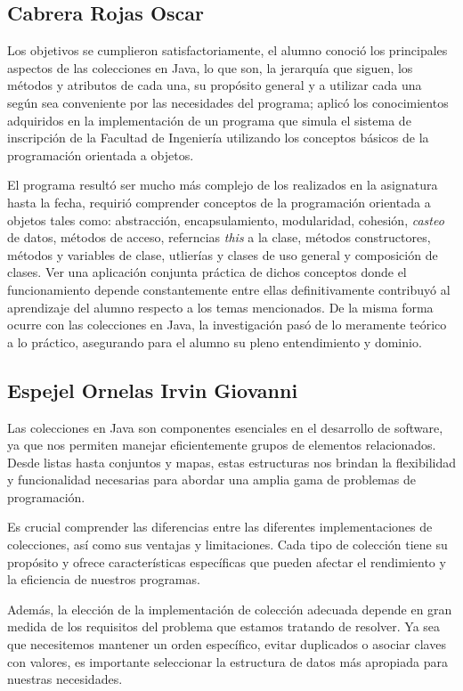 \documentclass[a4paper,12pt]{article}
\begin{document}
\subsection{Cabrera Rojas Oscar}

Los objetivos se cumplieron satisfactoriamente, el alumno conoció los principales aspectos de las colecciones en Java, lo que son, la jerarquía que siguen, los métodos y atributos de cada una, su propósito general y a utilizar cada una según sea conveniente por las necesidades del programa; aplicó los conocimientos adquiridos en la implementación de un programa que simula el sistema de inscripción de la Facultad de Ingeniería utilizando los conceptos básicos de la programación orientada a objetos.

El programa resultó ser mucho más complejo de los realizados en la asignatura hasta la fecha, requirió comprender conceptos de la programación orientada a objetos tales como: abstracción, encapsulamiento, modularidad, cohesión, \textit{casteo} de datos, métodos de acceso, referncias \textit{this} a la clase, métodos constructores, métodos y variables de clase, utlierías y clases de uso general y composición de clases. Ver una aplicación conjunta práctica de dichos conceptos donde el funcionamiento depende constantemente entre ellas definitivamente contribuyó al aprendizaje del alumno respecto a los temas mencionados. De la misma forma ocurre con las colecciones en Java, la investigación pasó de lo meramente teórico a lo práctico, asegurando para el alumno su pleno entendimiento y dominio.

\subsection{Espejel Ornelas Irvin Giovanni}

Las colecciones en Java son componentes esenciales en el desarrollo de software, ya que nos permiten manejar eficientemente grupos de elementos relacionados. Desde listas hasta conjuntos y mapas, estas estructuras nos brindan la flexibilidad y funcionalidad necesarias para abordar una amplia gama de problemas de programación. 

Es crucial comprender las diferencias entre las diferentes implementaciones de colecciones, así como sus ventajas y limitaciones. Cada tipo de colección tiene su propósito y ofrece características específicas que pueden afectar el rendimiento y la eficiencia de nuestros programas. 

Además, la elección de la implementación de colección adecuada depende en gran medida de los requisitos del problema que estamos tratando de resolver. Ya sea que necesitemos mantener un orden específico, evitar duplicados o asociar claves con valores, es importante seleccionar la estructura de datos más apropiada para nuestras necesidades.
\end{document}
